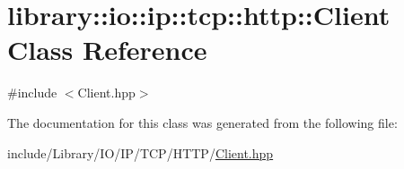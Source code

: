 \hypertarget{classlibrary_1_1io_1_1ip_1_1tcp_1_1http_1_1_client}{}\section{library\+:\+:io\+:\+:ip\+:\+:tcp\+:\+:http\+:\+:Client Class Reference}
\label{classlibrary_1_1io_1_1ip_1_1tcp_1_1http_1_1_client}


{\ttfamily \#include $<$Client.\+hpp$>$}



The documentation for this class was generated from the following file\+:\begin{DoxyCompactItemize}
\item 
include/\+Library/\+I\+O/\+I\+P/\+T\+C\+P/\+H\+T\+T\+P/\hyperlink{_h_t_t_p_2_client_8hpp}{Client.\+hpp}\end{DoxyCompactItemize}
